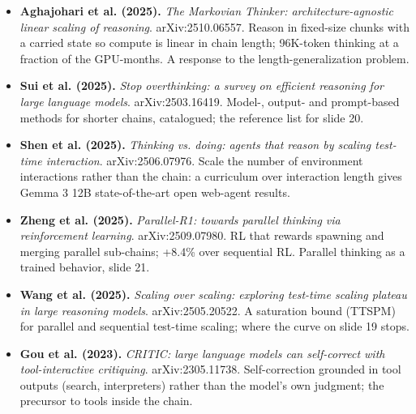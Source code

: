 \begin{itemize}[leftmargin=1.2em,itemsep=3pt]
\item \textbf{Aghajohari et al. (2025).} \textit{The Markovian Thinker: architecture-agnostic linear scaling of reasoning}. arXiv:2510.06557. Reason in fixed-size chunks with a carried state so compute is linear in chain length; 96K-token thinking at a fraction of the GPU-months. A response to the length-generalization problem.
\item \textbf{Sui et al. (2025).} \textit{Stop overthinking: a survey on efficient reasoning for large language models}. arXiv:2503.16419. Model-, output- and prompt-based methods for shorter chains, catalogued; the reference list for slide 20.
\item \textbf{Shen et al. (2025).} \textit{Thinking vs. doing: agents that reason by scaling test-time interaction}. arXiv:2506.07976. Scale the number of environment interactions rather than the chain: a curriculum over interaction length gives Gemma 3 12B state-of-the-art open web-agent results.
\item \textbf{Zheng et al. (2025).} \textit{Parallel-R1: towards parallel thinking via reinforcement learning}. arXiv:2509.07980. RL that rewards spawning and merging parallel sub-chains; +8.4\% over sequential RL. Parallel thinking as a trained behavior, slide 21.
\item \textbf{Wang et al. (2025).} \textit{Scaling over scaling: exploring test-time scaling plateau in large reasoning models}. arXiv:2505.20522. A saturation bound (TTSPM) for parallel and sequential test-time scaling; where the curve on slide 19 stops.
\item \textbf{Gou et al. (2023).} \textit{CRITIC: large language models can self-correct with tool-interactive critiquing}. arXiv:2305.11738. Self-correction grounded in tool outputs (search, interpreters) rather than the model's own judgment; the precursor to tools inside the chain.
\end{itemize}
